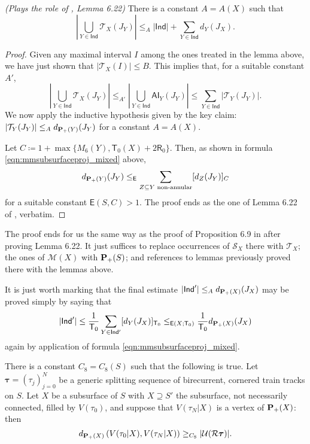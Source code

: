 \begin{lemma}\emph{(Plays the role of \cite{mms}, Lemma 6.22)}
There is a constant $A=A(X)$ such that
$$
\left|\bigcup_{Y\in \mathsf{Ind}}\mathcal T_X(J_Y)\right|\leq_A |\mathsf{Ind}|+ \sum_{Y\in \mathsf{Ind}} d_Y(J_X).
$$
\end{lemma}
\begin{proof}
Given any maximal interval $I$ among the ones treated in the lemma above, we have just shown that $|\mathcal T_X(I)|\leq B$. This implies that, for a suitable constant $A'$,
$$\left|\bigcup_{Y\in \mathsf{Ind}}\mathcal T_X(J_Y)\right|\leq_{A'}  \left|\bigcup_{Y\in \mathsf{Ind}}\mathsf{AI}_Y(J_Y)\right|\leq \sum_{Y\in\mathsf{Ind}} |\mathcal T_Y(J_Y)|.$$
We now apply the inductive hypothesis given by the key claim: $|\mathcal T_Y(J_Y)|\leq_A d_{{\mathbf{P}_+}(Y)}(J_Y)$ for a constant $A=A(X)$.

Let $C\coloneqq 1+\max\{ M_6(Y), \mathsf{T}_0(X)+2\mathsf{R}_0\}$. Then, as shown in formula \ref{eqn:mmsubsurfaceproj_mixed} above,
$$
d_{{\mathbf{P}_+}(Y)}(J_Y)\leq_{\mathsf{E}} \sum_{Z\subseteq Y\text{ non-annular}} [d_Z(J_Y)]_C
$$
for a suitable constant $\mathsf E(S,C)>1$. The proof ends as the one of Lemma 6.22 of \cite{mms}, verbatim.
\end{proof}

The proof ends for us the same way as the proof of Proposition 6.9 in \cite{mms} after proving Lemma 6.22. It just suffices to replace occurrences of $\mathcal S_X$ there with $\mathcal T_X$; the ones of $\mathcal M(X)$ with ${\mathbf{P}_+}(S)$; and references to lemmas previously proved there with the lemmas above. 

It is just worth marking that the final estimate $|\mathsf{Ind}'|\leq_A d_{{\mathbf{P}_+}(X)}(J_X)$ may be proved simply by saying that
$$
|\mathsf{Ind}'|\leq \frac{1}{\mathsf T_0}\sum_{Y\in\mathsf{Ind'}} [d_Y(J_X)]_{\mathsf T_0} \leq_{\mathsf E(X;\mathsf T_0)} \frac{1}{\mathsf T_0}d_{{\mathbf{P}_+}(X)}(J_X)
$$
again by application of formula \ref{eqn:mmsubsurfaceproj_mixed}.
\cvd

\begin{coroll}\label{cor:hardttbound}
There is a constant $C_8=C_8(S)$ such that the following is true. Let $\bm\tau=(\tau_j)_{j=0}^N$ be a generic splitting sequence of birecurrent, cornered train tracks on $S$. Let $X$ be a subsurface of $S$ with $X\supseteq S'$ the subsurface, not necessarily connected, filled by $V(\tau_0)$, and suppose that $V(\tau_N|X)$ is a vertex of ${\mathbf{P}_+}(X)$: then
$$d_{{\mathbf{P}_+}(X)}\left(V(\tau_0|X),V(\tau_N|X)\right)\geq_{C_8} |{\mathcal U}({\mathcal R}\bm\tau)|.$$
\end{coroll}

